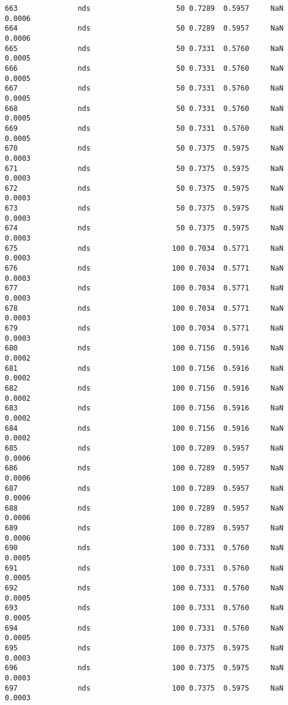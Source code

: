 \documentclass[11pt]{article}
\begin{document}
\begin{Verbatim}[commandchars=\\\{\}]
663              nds                    50 0.7289  0.5957     NaN 0.0006   
664              nds                    50 0.7289  0.5957     NaN 0.0006   
665              nds                    50 0.7331  0.5760     NaN 0.0005   
666              nds                    50 0.7331  0.5760     NaN 0.0005   
667              nds                    50 0.7331  0.5760     NaN 0.0005   
668              nds                    50 0.7331  0.5760     NaN 0.0005   
669              nds                    50 0.7331  0.5760     NaN 0.0005   
670              nds                    50 0.7375  0.5975     NaN 0.0003   
671              nds                    50 0.7375  0.5975     NaN 0.0003   
672              nds                    50 0.7375  0.5975     NaN 0.0003   
673              nds                    50 0.7375  0.5975     NaN 0.0003   
674              nds                    50 0.7375  0.5975     NaN 0.0003   
675              nds                   100 0.7034  0.5771     NaN 0.0003   
676              nds                   100 0.7034  0.5771     NaN 0.0003   
677              nds                   100 0.7034  0.5771     NaN 0.0003   
678              nds                   100 0.7034  0.5771     NaN 0.0003   
679              nds                   100 0.7034  0.5771     NaN 0.0003   
680              nds                   100 0.7156  0.5916     NaN 0.0002   
681              nds                   100 0.7156  0.5916     NaN 0.0002   
682              nds                   100 0.7156  0.5916     NaN 0.0002   
683              nds                   100 0.7156  0.5916     NaN 0.0002   
684              nds                   100 0.7156  0.5916     NaN 0.0002   
685              nds                   100 0.7289  0.5957     NaN 0.0006   
686              nds                   100 0.7289  0.5957     NaN 0.0006   
687              nds                   100 0.7289  0.5957     NaN 0.0006   
688              nds                   100 0.7289  0.5957     NaN 0.0006   
689              nds                   100 0.7289  0.5957     NaN 0.0006   
690              nds                   100 0.7331  0.5760     NaN 0.0005   
691              nds                   100 0.7331  0.5760     NaN 0.0005   
692              nds                   100 0.7331  0.5760     NaN 0.0005   
693              nds                   100 0.7331  0.5760     NaN 0.0005   
694              nds                   100 0.7331  0.5760     NaN 0.0005   
695              nds                   100 0.7375  0.5975     NaN 0.0003   
696              nds                   100 0.7375  0.5975     NaN 0.0003   
697              nds                   100 0.7375  0.5975     NaN 0.0003   

\end{Verbatim}
\end{document}
